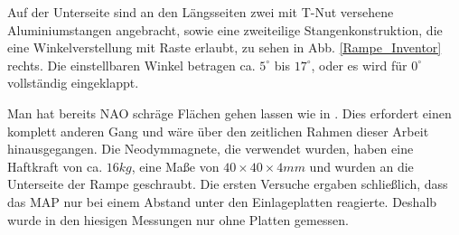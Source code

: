 Auf der Unterseite sind an den Längsseiten zwei mit T-Nut versehene Aluminiumstangen angebracht, sowie eine zweiteilige Stangenkonstruktion, die eine Winkelverstellung mit Raste erlaubt, zu sehen in Abb. \ref{Rampe_Inventor} rechts. Die einstellbaren Winkel betragen ca. $5^\circ$ bis $17^\circ$, oder es wird für $0^\circ$ vollständig eingeklappt.
  
Man hat bereits NAO schräge Flächen gehen lassen wie in \cite{Lutz_naowalking}. Dies erfordert einen komplett anderen Gang und wäre über den zeitlichen Rahmen dieser Arbeit hinausgegangen. Die Neodymmagnete, die verwendet wurden, haben eine Haftkraft von ca. $16 \unit{kg}$, eine Maße von $40\times40\times4 \unit{mm}$ \cite{schraubmagnet} und wurden an die Unterseite der Rampe geschraubt. Die ersten Versuche ergaben schließlich, dass das MAP nur bei einem Abstand unter den Einlageplatten reagierte. Deshalb wurde in den hiesigen Messungen nur ohne Platten gemessen.




